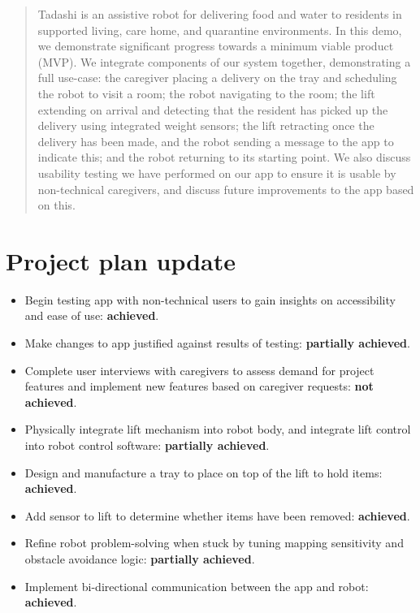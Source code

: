 \documentclass{article}
\begin{document}
 



\begin{abstract}
  Tadashi is an assistive robot for delivering food and water to residents in supported living, care home, and quarantine environments.
  In this demo, we demonstrate significant progress towards a minimum viable product (MVP). We integrate components of our system together, demonstrating a full use-case: the caregiver placing a delivery on the tray and scheduling the robot to visit a room; the robot navigating to the room; the lift extending on arrival and detecting that the resident has picked up the delivery using integrated weight sensors; the lift retracting once the delivery has been made, and the robot sending a message to the app to indicate this; and the robot returning to its starting point. We also discuss usability testing we have performed on our app to ensure it is usable by non-technical caregivers, and discuss future improvements to the app based on this. 
\end{abstract} 

\section{Project plan update} 
\begin{itemize}
\item Begin testing app with non-technical users to gain insights on accessibility and ease of use: {\bf achieved}.
\item Make changes to app justified against results of testing: {\bf partially achieved}.
\item Complete user interviews with caregivers to assess demand for project features and implement new features based on caregiver requests: {\bf not achieved}.
\item Physically integrate lift mechanism into robot body, and integrate lift control into robot control software: {\bf partially achieved}.
\item Design and manufacture a tray to place on top of the lift to hold items: {\bf achieved}.
\item Add sensor to lift to determine whether items have been removed: {\bf achieved}.
\item Refine robot problem-solving when stuck by tuning mapping sensitivity and obstacle avoidance logic: {\bf partially achieved}. 
\item Implement bi-directional communication between the app and robot: {\bf achieved}.
\end{itemize}
\end{document}
